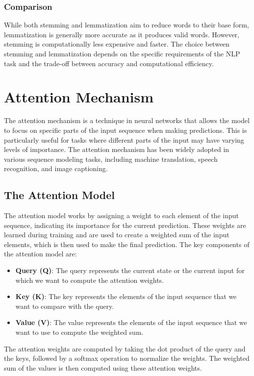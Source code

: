 \documentclass[12pt]{article}
\begin{document}
\subsubsection{Comparison}
While both stemming and lemmatization aim to reduce words to their base form, lemmatization is generally more accurate as it produces valid words. However, stemming is computationally less expensive and faster. The choice between stemming and lemmatization depends on the specific requirements of the NLP task and the trade-off between accuracy and computational efficiency.

\section{Attention Mechanism}
The attention mechanism is a technique in neural networks that allows the model to focus on specific parts of the input sequence when making predictions. This is particularly useful for tasks where different parts of the input may have varying levels of importance. The attention mechanism has been widely adopted in various sequence modeling tasks, including machine translation, speech recognition, and image captioning.

\subsection{The Attention Model}
The attention model works by assigning a weight to each element of the input sequence, indicating its importance for the current prediction. These weights are learned during training and are used to create a weighted sum of the input elements, which is then used to make the final prediction. The key components of the attention model are:

\begin{itemize}
    \item \textbf{Query (Q)}: The query represents the current state or the current input for which we want to compute the attention weights.
    \item \textbf{Key (K)}: The key represents the elements of the input sequence that we want to compare with the query.
    \item \textbf{Value (V)}: The value represents the elements of the input sequence that we want to use to compute the weighted sum.
\end{itemize}

The attention weights are computed by taking the dot product of the query and the keys, followed by a softmax operation to normalize the weights. The weighted sum of the values is then computed using these attention weights.
\end{document}
